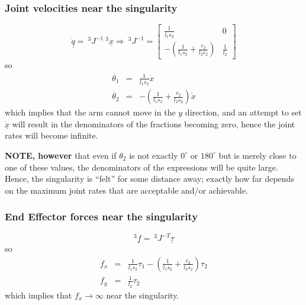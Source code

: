 \documentclass[]{article}
\begin{document}
\subsubsection{Joint velocities near the singularity}
\begin{displaymath}
	\dot{\underline{q}} = \ \!^{3}J^{-1}\ \!^{3}\underline{x} \Rightarrow \ \!^{3}J^{-1} = \left[\begin{array}{cc} \frac{1}{l_{1}s_{2}} & 0 \\ -(\frac{1}{l_{1}s_{2}} + \frac{c_{2}}{l_{2}c_{2}}) & \frac{1}{l_{2}} \end{array}\right]
\end{displaymath}
so
\begin{eqnarray}
	\dot{\theta_{1}} & = & \frac{1}{l_{1}s_{2}}\dot{x} \nonumber\\
	\dot{\theta_{2}} & = & -\left(\frac{1}{l_{1}s_{2}} + \frac{c_{2}}{l_{2}s_{2}}\right)\dot{x} \nonumber
\end{eqnarray}
which implies that the arm cannot move in the $y$ direction, and an attempt to set $\dot{\underline{x}}$ will result in the denominators of the fractions becoming zero, hence the joint rates will become infinite.

\textbf{NOTE, however} that even if $\theta_{2}$ is not exactly $0^{\circ}$ or $180^{\circ}$ but is merely close to one of these values, the denominators of the expressions will be quite large. Hence, the singularity is ``felt'' for some distance away; exactly how far depends on the maximum joint rates that are acceptable and/or achievable.

\subsubsection{End Effector forces near the singularity}
\begin{displaymath}
^{3}\underline{f} = \ \!^{3}J^{-T}\underline{\tau}
\end{displaymath}
so
\begin{eqnarray}
	f_{x} & = & \frac{1}{l_{1}s_{2}}\tau_{1} - \left(\frac{1}{l_{1}s_{2}} + \frac{c_{2}}{l_{2}s_{2}}\right) \tau_{2} \nonumber \\
	f_{y} & = & \frac{1}{l_{2}}\tau_{2} \nonumber
\end{eqnarray}
which implies that $f_{x} \rightarrow \infty$ near the singularity.
\end{document}
